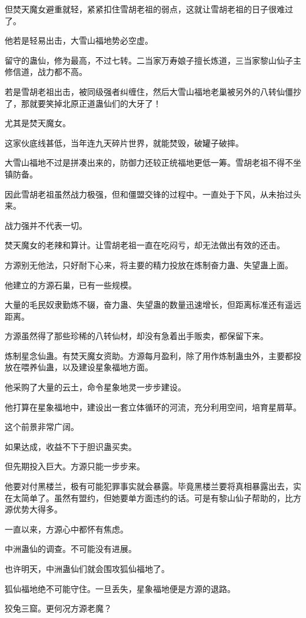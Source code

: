 \begin{this_body}
但焚天魔女避重就轻，紧紧扣住雪胡老祖的弱点，这就让雪胡老祖的日子很难过了。

他若是轻易出击，大雪山福地势必空虚。

留守的蛊仙，修为最高，不过七转。二当家万寿娘子擅长炼道，三当家黎山仙子主修信道，战力都不高。

若是雪胡老祖出击，被同级强者纠缠住，然后大雪山福地老巢被另外的八转仙僵抄了，那就要笑掉北原正道蛊仙们的大牙了！

尤其是焚天魔女。

这家伙底线甚低，当年连九天碎片世界，就能焚毁，破罐子破摔。

大雪山福地不过是拼凑出来的，防御力还较正统福地更低一筹。雪胡老祖不得不坐镇防备。

因此雪胡老祖虽然战力极强，但和僵盟交锋的过程中。一直处于下风，从未抬过头来。

战力强并不代表一切。

焚天魔女的老辣和算计。让雪胡老祖一直在吃闷亏，却无法做出有效的还击。

方源别无他法，只好耐下心来，将主要的精力投放在炼制奋力蛊、失望蛊上面。

他建立的方源石巢，已有一些规模。

大量的毛民奴隶勤炼不辍，奋力蛊、失望蛊的数量迅速增长，但距离标准还有遥远距离。

方源虽然得了那些珍稀的八转仙材，却没有急着出手贩卖，都保留下来。

炼制星念仙蛊。有焚天魔女资助。方源每月盈利，除了用作炼制蛊虫外，主要都投放在喂养仙蛊，以及建设星象福地方面。

他采购了大量的云土，命令星象地灵一步步建设。

他打算在星象福地中，建设出一套立体循环的河流，充分利用空间，培育星屑草。

这个前景非常广阔。

如果达成，收益不下于胆识蛊买卖。

但先期投入巨大。方源只能一步步来。

他要对付黑楼兰，极有可能犯罪事实就会暴露。毕竟黑楼兰要将真相暴露出去，实在太简单了。虽然有盟约，但她要单方面违约的话。可是有黎山仙子帮助的，比方源优势大得多。

一直以来，方源心中都怀有焦虑。

中洲蛊仙的调查。不可能没有进展。

也许明天，中洲蛊仙们就会围攻狐仙福地了。

狐仙福地绝不可能守住。一旦丢失，星象福地便是方源的退路。

狡兔三窟。更何况方源老魔？


\end{this_body}
